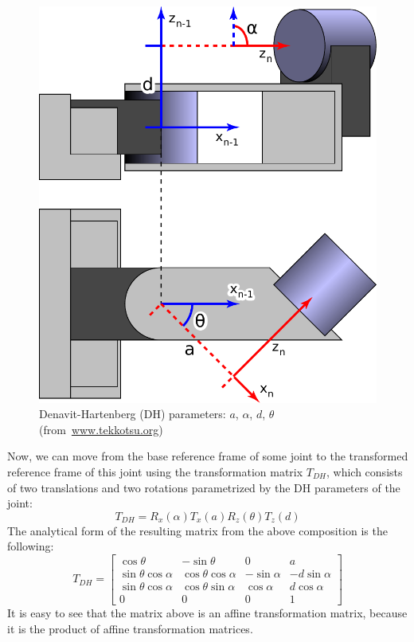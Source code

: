 \begin{figure}[t!]
	\begin{center}
		\includegraphics[height=.4\textheight]{Figures/Sample_Denavit-Hartenberg_Diagram.pdf}
 		\caption{Denavit-Hartenberg (DH) parameters: $a$, $\alpha$, $d$, $\theta$ (from~\url{www.tekkotsu.org})}
 		\label{fig:DH}
	\end{center}
\end{figure}

Now, we can move from the base reference frame of some joint to the transformed reference frame of this joint using the transformation matrix $T_{DH}$, which consists of two translations and two rotations parametrized by the DH parameters of the joint:
\[T_{DH} = R_x(\alpha)T_x(a)R_z(\theta)T_z(d)\]
The analytical form of the resulting matrix from the above composition is the following:
\[
T_{DH} = 
\begin{bmatrix}
\cos\theta & -\sin\theta & 0 & a\\
\sin\theta\cos\alpha & \cos\theta\cos\alpha & -\sin\alpha & -d\sin\alpha\\
\sin\theta\cos\alpha & \cos\theta\sin\alpha & \cos\alpha & d\cos\alpha\\
0 & 0 & 0 & 1
\end{bmatrix}
\]
It is easy to see that the matrix above is an affine transformation matrix, because it is the product of affine transformation matrices.

